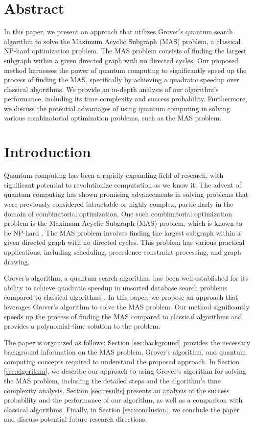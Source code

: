 \section{Abstract}
In this paper, we present an approach that utilizes Grover's quantum search algorithm to solve the Maximum Acyclic Subgraph (MAS) problem, a classical NP-hard optimization problem. The MAS problem consists of finding the largest subgraph within a given directed graph with no directed cycles. Our proposed method harnesses the power of quantum computing to significantly speed up the process of finding the MAS, specifically by achieving a quadratic speedup over classical algorithms. We provide an in-depth analysis of our algorithm's performance, including its time complexity and success probability. Furthermore, we discuss the potential advantages of using quantum computing in solving various combinatorial optimization problems, such as the MAS problem.

\section{Introduction}
\label{sec:intro}
Quantum computing has been a rapidly expanding field of research, with significant potential to revolutionize computation as we know it. The advent of quantum computing has shown promising advancements in solving problems that were previously considered intractable or highly complex, particularly in the domain of combinatorial optimization. One such combinatorial optimization problem is the Maximum Acyclic Subgraph (MAS) problem, which is known to be NP-hard \cite{garey1979computers}. The MAS problem involves finding the largest subgraph within a given directed graph with no directed cycles. This problem has various practical applications, including scheduling, precedence constraint processing, and graph drawing.

Grover's algorithm, a quantum search algorithm, has been well-established for its ability to achieve quadratic speedup in unsorted database search problems compared to classical algorithms \cite{grover1996fast}. In this paper, we propose an approach that leverages Grover's algorithm to solve the MAS problem. Our method significantly speeds up the process of finding the MAS compared to classical algorithms and provides a polynomial-time solution to the problem.

The paper is organized as follows: Section \ref{sec:background} provides the necessary background information on the MAS problem, Grover's algorithm, and quantum computing concepts required to understand the proposed approach. In Section \ref{sec:algorithm}, we describe our approach to using Grover's algorithm for solving the MAS problem, including the detailed steps and the algorithm's time complexity analysis. Section \ref{sec:results} presents an analysis of the success probability and the performance of our algorithm, as well as a comparison with classical algorithms. Finally, in Section \ref{sec:conclusion}, we conclude the paper and discuss potential future research directions.

